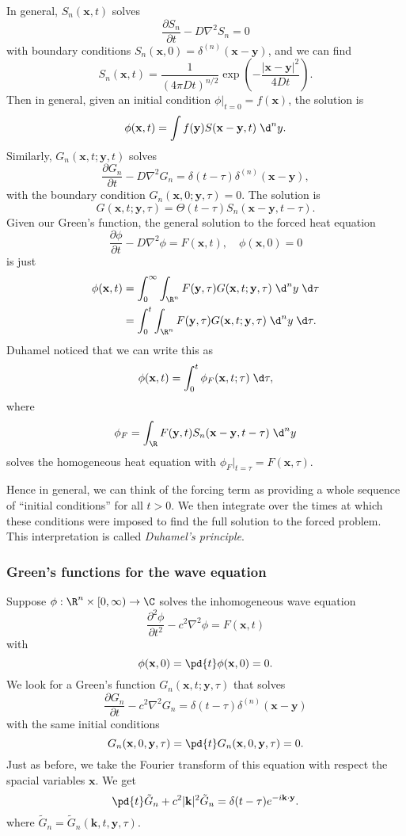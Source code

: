 \documentclass[a4paper]{article}
\begin{document}
In general, $S_n(\mathbf{x}, t)$ solves
\[
  \frac{\partial S_n}{\partial t} - D \nabla^2 S_n = 0
\]
with boundary conditions $S_n(\mathbf{x}, 0) = \delta^{(n)}(\mathbf{x} - \mathbf{y})$, and we can find
\[
  S_n(\mathbf{x}, t) = \frac{1}{(4\pi D t)^{n/2}} \exp\left(-\frac{|\mathbf{x} - \mathbf{y}|^2}{4 Dt}\right).
\]
Then in general, given an initial condition $\phi|_{t = 0}= f(\mathbf{x})$, the solution is
\[
  \phi(\mathbf{x}, t) = \int f(\mathbf{y}) S(\mathbf{x} - \mathbf{y}, t)\;\d^n y.
\]
Similarly, $G_n(\mathbf{x}, t; \mathbf{y}, t)$ solves
\[
  \frac{\partial G_n}{\partial t} - D \nabla^2 G_n = \delta(t - \tau) \delta^{(n)} (\mathbf{x} - \mathbf{y}),
\]
with the boundary condition $G_n(\mathbf{x}, 0; \mathbf{y}, \tau) = 0$. The solution is
\[
  G(\mathbf{x}, t; \mathbf{y}, \tau) = \Theta(t - \tau) S_n (\mathbf{x} - \mathbf{y}, t - \tau).
\]
Given our Green's function, the general solution to the forced heat equation
\[
  \frac{\partial \phi}{\partial t} - D \nabla^2 \phi = F(\mathbf{x}, t),\quad \phi(\mathbf{x}, 0) = 0
\]
is just
\begin{align*}
  \phi(\mathbf{x}, t) &= \int_0^\infty \int_{\R^n} F(\mathbf{y}, \tau) G(\mathbf{x}, t; \mathbf{y}, \tau) \;\d^n y \;\d \tau \\
  &= \int_0^t \int_{\R^n} F(\mathbf{y}, \tau) G(\mathbf{x}, t; \mathbf{y}, \tau) \;\d^n y \;\d \tau.
\end{align*}
Duhamel noticed that we can write this as
\[
  \phi(\mathbf{x}, t) = \int_0^t \phi_F(\mathbf{x}, t; \tau)\;\d \tau,
\]
where
\[
  \phi_F = \int_\R F(\mathbf{y}, t) S_n(\mathbf{x} - \mathbf{y}, t - \tau)\;\d^n y
\]
solves the homogeneous heat equation with $\phi_F |_{t = \tau} = F(\mathbf{x}, \tau)$.

Hence in general, we can think of the forcing term as providing a whole sequence of ``initial conditions'' for all $t > 0$. We then integrate over the times at which these conditions were imposed to find the full solution to the forced problem. This interpretation is called \emph{Duhamel's principle}.
\subsubsection*{Green's functions for the wave equation}
Suppose $\phi: \R^n \times [0, \infty) \to \C$ solves the inhomogeneous wave equation
\[
  \frac{\partial^2 \phi}{\partial t^2} - c^2 \nabla^2 \phi = F(\mathbf{x}, t)
\]
with
\[
  \phi(\mathbf{x}, 0) = \pd{t} \phi(\mathbf{x}, 0) = 0.
\]
We look for a Green's function $G_n(\mathbf{x}, t; \mathbf{y}, \tau)$ that solves
\[
  \frac{\partial G_n}{\partial t} - c^2 \nabla^2 G_n = \delta(t - \tau) \delta^{(n)}(\mathbf{x} - \mathbf{y}) \tag{$*$}
\]
with the same initial conditions
\[
  G_n(\mathbf{x}, 0, \mathbf{y}, \tau) = \pd{t} G_n(\mathbf{x}, 0, \mathbf{y}, \tau) = 0.
\]
Just as before, we take the Fourier transform of this equation with respect the spacial variables $\mathbf{x}$. We get
\[
  \pd{t} \tilde{G}_n + c^2 |\mathbf{k}|^2 \tilde{G}_n = \delta(t - \tau) e^{-i\mathbf{k} \cdot \mathbf{y}}.
\]
where $\tilde{G}_n = \tilde{G}_n(\mathbf{k}, t, \mathbf{y}, \tau)$.
\end{document}
